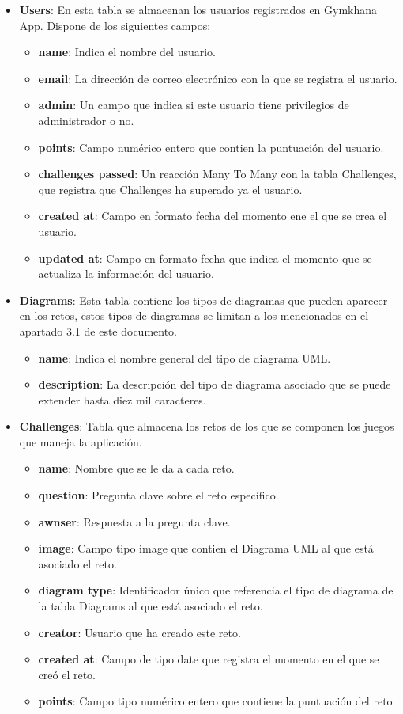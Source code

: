 \documentclass[a4paper, 12pt]{book}
\begin{document}
\begin{itemize}
	\item \textbf {Users}: En esta tabla se almacenan los usuarios registrados en Gymkhana App. Dispone de los siguientes campos: 
	\begin{itemize}
		\item \textbf {name}: Indica el nombre del usuario. 
		\item \textbf {email}: La dirección de correo electrónico con la que se registra el usuario. 
		\item \textbf {admin}: Un campo que indica si este usuario tiene privilegios de administrador o no. 
		\item \textbf {points}: Campo numérico entero que contien la puntuación del usuario. 
		\item \textbf {challenges passed}: Un reacción Many To Many con la tabla Challenges, que registra que Challenges ha superado ya el usuario. 
		\item \textbf {created at}: Campo en formato fecha del momento ene el que se crea el usuario. 
		\item \textbf {updated at}: Campo en formato fecha que indica el momento que se actualiza la información del usuario. 
	\end{itemize}

	\item \textbf {Diagrams}: Esta tabla contiene los tipos de diagramas que pueden aparecer en los retos, estos tipos de diagramas se limitan a los mencionados en el apartado 3.1 de este documento.  
	\begin{itemize}
		\item \textbf {name}: Indica el nombre general del tipo de diagrama UML. 
		\item \textbf {description}: La descripción del tipo de diagrama asociado que se puede extender hasta diez mil caracteres. 
	\end{itemize}
	
	\item \textbf {Challenges}: Tabla que almacena los retos de los que se componen los juegos que maneja la aplicación. 
	\begin{itemize}
		\item \textbf {name}: Nombre que se le da a cada reto.
		\item \textbf {question}: Pregunta clave sobre el reto específico. 
		\item \textbf {awnser}: Respuesta a la pregunta clave. 
		\item \textbf {image}: 	Campo tipo image que contien el Diagrama UML al que está asociado el reto. 
		\item \textbf {diagram type}: Identificador único que referencia el tipo de diagrama de la tabla Diagrams al que está asociado el reto. 
		\item \textbf {creator}: Usuario que ha creado este reto. 
		\item \textbf {created at}: Campo de tipo date que registra el momento en el que se creó el reto. 
		\item \textbf {points}: Campo tipo numérico entero que contiene la puntuación del reto. 		
	\end{itemize}
	

\end{itemize}
\end{document}
